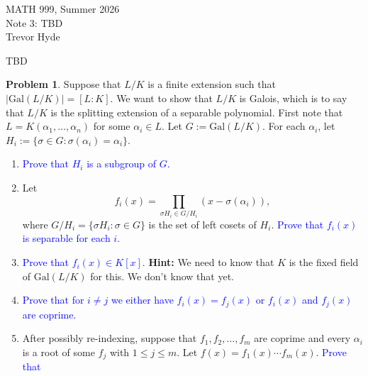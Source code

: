 \documentclass[11pt]{article}
\def\gal{\mathrm{Gal}}
\theoremstyle{definition}
\newtheorem{problem}{Problem}[section]
\numberwithin{equation}{subsection}
\newcommand{\head}[1]{
	\begin{center}
		{\large #1}
		\vspace{.05 in}
	\end{center}
	\bigskip 
}
\newcommand{\blue}[1]{\textcolor{blue}{#1}}
\begin{document}
\pagestyle{plain}

\setcounter{section}{3}   

\head{MATH 999, Summer 2026\\ Note 3: TBD\\
Trevor Hyde}


\begin{center}
   TBD
\end{center}
\vspace{.1in}

\begin{problem}
    Suppose that $L/K$ is a finite extension such that $|\gal(L/K)| = [L : K]$.
    We want to show that $L/K$ is Galois, which is to say that $L/K$ is the splitting extension of a separable polynomial.
    First note that $L = K(\alpha_1,\ldots, \alpha_n)$ for some $\alpha_i \in L$.
    Let $G := \gal(L/K)$.
    For each $\alpha_i$, let $H_i := \{\sigma \in G: \sigma(\alpha_i) = \alpha_i\}$.
    \begin{enumerate}
        \item \blue{Prove that $H_i$ is a subgroup of $G$.}
        \item Let 
        \[
            f_i(x) = \prod_{\sigma H_i \in G/H_i}(x - \sigma(\alpha_i)),
        \]
        where $G/H_i = \{\sigma H_i : \sigma\in G\}$ is the set of left cosets of $H_i$.
        \blue{Prove that $f_i(x)$ is separable for each $i$.}
        \item \blue{Prove that $f_i(x) \in K[x]$.}
        \textbf{Hint: }We need to know that $K$ is the fixed field of $\gal(L/K)$ for this. We don't know that yet.
        \item \blue{Prove that for $i \neq j$ we either have $f_i(x) = f_j(x)$ or $f_i(x)$ and $f_j(x)$ are coprime.}
        \item After possibly re-indexing, suppose that $f_1, f_2,\ldots, f_m$ are coprime and every $\alpha_i$ is a root of some $f_j$ with $1 \leq j \leq m$.
        Let $f(x) = f_1(x)\cdots f_m(x)$.
        \blue{Prove that }
    \end{enumerate}
\end{problem}



\end{document}
